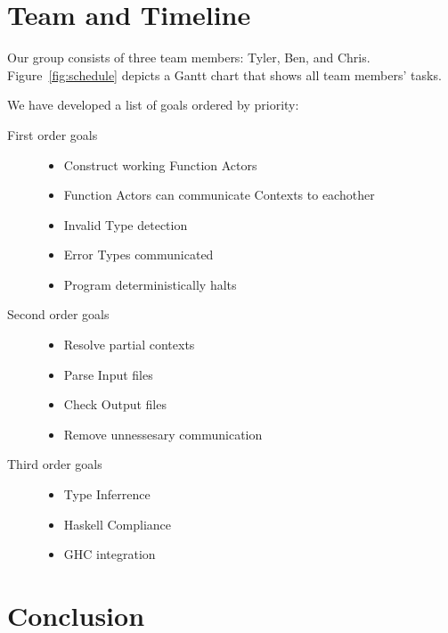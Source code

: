 \documentclass{acm_proc_article-sp}
\begin{document}
\section{Team and Timeline}

Our group consists of three team members: Tyler, Ben, and Chris.
Figure~\ref{fig:schedule} depicts a Gantt chart that shows all team members'
tasks.

We have developed a list of goals ordered by priority:
\begin{description}
	\item[First order goals]
          \hfill
          \begin{itemize}
            \item Construct working Function Actors 
            \item Function Actors can communicate Contexts to eachother
            \item Invalid Type detection
            \item Error Types communicated
            \item Program deterministically halts
          \end{itemize}

	\item[Second order goals]
          \hfill
          \begin{itemize}
            \item Resolve partial contexts
            \item Parse Input files
            \item Check Output files
            \item Remove unnessesary communication
          \end{itemize}

	\item[Third order goals]
          \hfill
          \begin{itemize}
            \item Type Inferrence
            \item Haskell Compliance
            \item GHC integration
          \end{itemize}
\end{description}

\section{Conclusion}

\appendix
\end{document}
